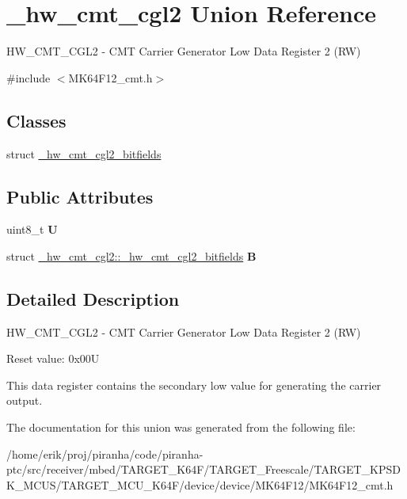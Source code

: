 \hypertarget{union__hw__cmt__cgl2}{}\section{\+\_\+hw\+\_\+cmt\+\_\+cgl2 Union Reference}
\label{union__hw__cmt__cgl2}


H\+W\+\_\+\+C\+M\+T\+\_\+\+C\+G\+L2 -\/ C\+MT Carrier Generator Low Data Register 2 (RW)  




{\ttfamily \#include $<$M\+K64\+F12\+\_\+cmt.\+h$>$}

\subsection*{Classes}
\begin{DoxyCompactItemize}
\item 
struct \hyperlink{struct__hw__cmt__cgl2_1_1__hw__cmt__cgl2__bitfields}{\+\_\+hw\+\_\+cmt\+\_\+cgl2\+\_\+bitfields}
\end{DoxyCompactItemize}
\subsection*{Public Attributes}
\begin{DoxyCompactItemize}
\item 
uint8\+\_\+t {\bfseries U}\hypertarget{union__hw__cmt__cgl2_acbd1d760a5fbc1def2bfa77d0f157f4f}{}\label{union__hw__cmt__cgl2_acbd1d760a5fbc1def2bfa77d0f157f4f}

\item 
struct \hyperlink{struct__hw__cmt__cgl2_1_1__hw__cmt__cgl2__bitfields}{\+\_\+hw\+\_\+cmt\+\_\+cgl2\+::\+\_\+hw\+\_\+cmt\+\_\+cgl2\+\_\+bitfields} {\bfseries B}\hypertarget{union__hw__cmt__cgl2_a9bfc197207bead4da8e20dcaf82fdda3}{}\label{union__hw__cmt__cgl2_a9bfc197207bead4da8e20dcaf82fdda3}

\end{DoxyCompactItemize}


\subsection{Detailed Description}
H\+W\+\_\+\+C\+M\+T\+\_\+\+C\+G\+L2 -\/ C\+MT Carrier Generator Low Data Register 2 (RW) 

Reset value\+: 0x00U

This data register contains the secondary low value for generating the carrier output. 

The documentation for this union was generated from the following file\+:\begin{DoxyCompactItemize}
\item 
/home/erik/proj/piranha/code/piranha-\/ptc/src/receiver/mbed/\+T\+A\+R\+G\+E\+T\+\_\+\+K64\+F/\+T\+A\+R\+G\+E\+T\+\_\+\+Freescale/\+T\+A\+R\+G\+E\+T\+\_\+\+K\+P\+S\+D\+K\+\_\+\+M\+C\+U\+S/\+T\+A\+R\+G\+E\+T\+\_\+\+M\+C\+U\+\_\+\+K64\+F/device/device/\+M\+K64\+F12/M\+K64\+F12\+\_\+cmt.\+h\end{DoxyCompactItemize}
